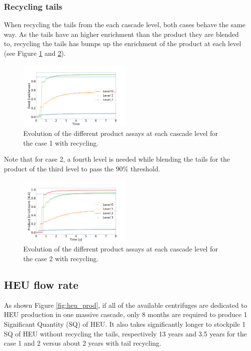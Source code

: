 \documentclass{anstrans}
\begin{document}
\subsubsection{Recycling tails}
When recycling the tails from the each cascade level, both cases behave
the same way. As the tails have an higher enrichment than the product they are
blended to, recycling the tails has bumps up the enrichment of the
product at each level (see Figure \ref{fig:assay_c1_r} and \ref{fig:assay_c2_r}).

\begin{figure}[ht] %
  \centering
  \includegraphics[width=0.5\textwidth]{assay_case_1_rec.png}
  \caption{Evolution of the different product assays at each cascade level for
  the case 1 with recycling. }\label{fig:assay_c1_r}
\end{figure}

Note that for case 2, a fourth level is needed while blending the tails for the product of the third level to pass the $90\%$ threshold.

\begin{figure}[ht] %
  \centering
  \includegraphics[width=0.5\textwidth]{assay_case_2_rec.png}
  \caption{Evolution of the different product assays at each cascade level for
  the case 2 with recycling.}\label{fig:assay_c2_r}
\end{figure}


\subsection{HEU flow rate}
As shown Figure \ref{fig:heu_prod}, if all of the available centrifuges are dedicated to HEU production in one massive cascade, only 8 months are required to
produce 1 Significant Quantity (SQ) of HEU. It also takes significantly longer to
stockpile 1 SQ of HEU without recycling the tails, respectively 13 years and 3.5 years
for the case 1 and 2 versus about 2 years with tail recycling.
\end{document}
